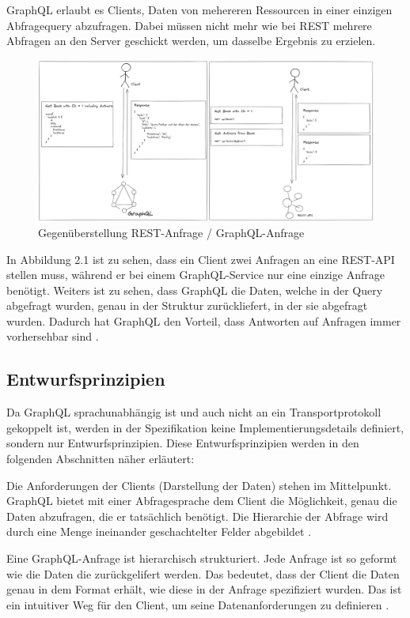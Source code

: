 GraphQL erlaubt es Clients, Daten von mehereren Ressourcen in einer einzigen Abfragequery abzufragen.
Dabei müssen nicht mehr wie bei REST mehrere Abfragen an den Server geschickt werden, um dasselbe Ergebnis zu erzielen.

\begin{figure}[H]
    \centering
    \includegraphics[width=\textwidth]{pics/graphql_rest_request.png}
    \caption{Gegenüberstellung REST-Anfrage / GraphQL-Anfrage}
\end{figure}

In Abbildung 2.1 ist zu sehen, dass ein Client zwei Anfragen an eine REST-API stellen muss, während er bei einem GraphQL-Service nur eine einzige Anfrage benötigt.
Weiters ist zu sehen, dass GraphQL die Daten, welche in der Query abgefragt wurden, genau in der Struktur zurückliefert, in der sie abgefragt wurden.
Dadurch hat GraphQL den Vorteil, dass Antworten auf Anfragen immer vorhersehbar sind \parencite[Abs. Basics of a GraphQL API]{rakutenGraphQLVsRest}.

\subsection{Entwurfsprinzipien}
Da GraphQL sprachunabhängig ist und auch nicht an ein Transportprotokoll gekoppelt ist, werden in der Spezifikation keine Implementierungsdetails definiert, sondern nur Entwurfsprinzipien.
Diese Entwurfsprinzipien werden in den folgenden Abschnitten näher erläutert:

Die Anforderungen der Clients (Darstellung der Daten) stehen im Mittelpunkt.
GraphQL bietet mit einer Abfragesprache dem Client die Möglichkeit, genau die Daten abzufragen, die er tatsächlich benötigt. Die Hierarchie der
Abfrage wird durch eine Menge ineinander geschachtelter Felder abgebildet \parencite[Abs. 1]{graphqlOnline}.

Eine GraphQL-Anfrage ist hierarchisch strukturiert.
Jede Anfrage ist so geformt wie die Daten die zurückgelifert werden.
Das bedeutet, dass der Client die Daten genau in dem Format erhält, wie diese in der Anfrage spezifiziert wurden.
Das ist ein intuitiver Weg für den Client, um seine Datenanforderungen zu definieren \parencite[Abs. 1]{graphqlOnline}.

